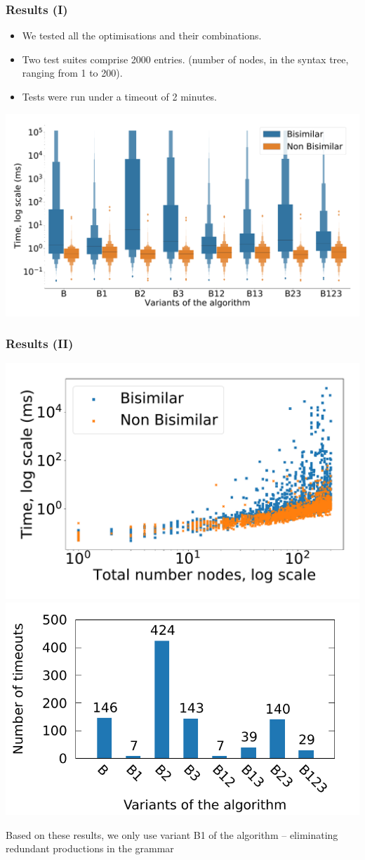 \documentclass[10pt]{beamer}
\begin{document}
\begin{frame}
  \frametitle{Results (I)}
  \begin{itemize}
  \item We tested all the optimisations and their combinations.
  \item Two test suites comprise 2000 entries. (number of
    nodes, in the syntax tree, ranging from 1 to 200).
  \item Tests were run under a timeout of 2 minutes.
  \end{itemize}
  \pause
  \includegraphics[scale=0.20]{img/distribution_boxplot.pdf}
\end{frame}

\begin{frame}
  \frametitle{Results (II)}
  \includegraphics[width=.55\textwidth]{img/nodes_time.pdf}%
  \includegraphics[width=.55\textwidth]{img/timeouts.pdf}

  Based on these results, we only use variant B1 of the algorithm
  -- eliminating redundant productions in the grammar
\end{frame}
\end{document}
